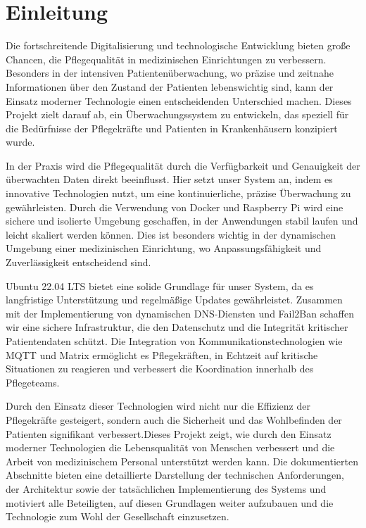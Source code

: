 \section{Einleitung}

Die fortschreitende Digitalisierung und technologische Entwicklung bieten große Chancen, die Pflegequalität in medizinischen Einrichtungen zu verbessern. Besonders in der intensiven Patientenüberwachung, wo präzise und zeitnahe Informationen über den Zustand der Patienten lebenswichtig sind, kann der Einsatz moderner Technologie einen entscheidenden Unterschied machen. Dieses Projekt zielt darauf ab, ein Überwachungssystem zu entwickeln, das speziell für die Bedürfnisse der Pflegekräfte und Patienten in Krankenhäusern konzipiert wurde.

In der Praxis wird die Pflegequalität durch die Verfügbarkeit und Genauigkeit der überwachten Daten direkt beeinflusst. Hier setzt unser System an, indem es innovative Technologien nutzt, um eine kontinuierliche, präzise Überwachung zu gewährleisten. Durch die Verwendung von Docker und Raspberry Pi wird eine sichere und isolierte Umgebung geschaffen, in der Anwendungen stabil laufen und leicht skaliert werden können. Dies ist besonders wichtig in der dynamischen Umgebung einer medizinischen Einrichtung, wo Anpassungsfähigkeit und Zuverlässigkeit entscheidend sind.

Ubuntu 22.04 LTS bietet eine solide Grundlage für unser System, da es langfristige Unterstützung und regelmäßige Updates gewährleistet. Zusammen mit der Implementierung von dynamischen DNS-Diensten und Fail2Ban schaffen wir eine sichere Infrastruktur, die den Datenschutz und die Integrität kritischer Patientendaten schützt. Die Integration von Kommunikationstechnologien wie MQTT und Matrix ermöglicht es Pflegekräften, in Echtzeit auf kritische Situationen zu reagieren und verbessert die Koordination innerhalb des Pflegeteams. 

Durch den Einsatz dieser Technologien wird nicht nur die Effizienz der Pflegekräfte gesteigert, sondern auch die Sicherheit und das Wohlbefinden der Patienten signifikant verbessert.Dieses Projekt zeigt, wie durch den Einsatz moderner Technologien die Lebensqualität von Menschen verbessert und die Arbeit von medizinischem Personal unterstützt werden kann. Die dokumentierten Abschnitte bieten eine detaillierte Darstellung der technischen Anforderungen, der Architektur sowie der tatsächlichen Implementierung des Systems und motiviert alle Beteiligten, auf diesen Grundlagen weiter aufzubauen und die Technologie zum Wohl der Gesellschaft einzusetzen.

